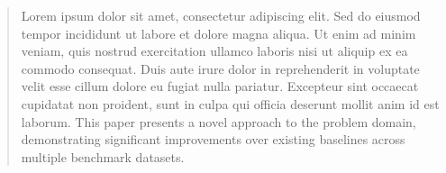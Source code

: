 \begin{abstract}
Lorem ipsum dolor sit amet, consectetur adipiscing elit. Sed do eiusmod tempor
incididunt ut labore et dolore magna aliqua. Ut enim ad minim veniam, quis
nostrud exercitation ullamco laboris nisi ut aliquip ex ea commodo consequat.
Duis aute irure dolor in reprehenderit in voluptate velit esse cillum dolore eu
fugiat nulla pariatur. Excepteur sint occaecat cupidatat non proident, sunt in
culpa qui officia deserunt mollit anim id est laborum. This paper presents a
novel approach to the problem domain, demonstrating significant improvements
over existing baselines across multiple benchmark datasets.
\end{abstract}
